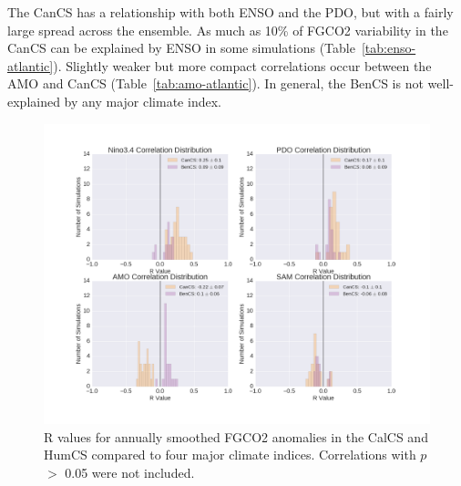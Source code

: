 \documentclass[12pt]{article}
\begin{document}
The CanCS has a relationship with both ENSO and the PDO, but with a fairly large spread across the ensemble. As much as 10\% of FGCO2 variability in the CanCS can be explained by ENSO in some simulations (Table~\ref{tab:enso-atlantic}). Slightly weaker but more compact correlations occur between the AMO and CanCS (Table~\ref{tab:amo-atlantic}). In general, the BenCS is not well-explained by any major climate index.

\begin{figure}[!h]
	\centering
	\includegraphics[width=\linewidth]{../../figs/atlantic/atlantic-EBU-correlation-distributions-bothSmoothed.png}
	\caption{R values for annually smoothed FGCO2 anomalies in the CalCS and HumCS compared to four major climate indices. Correlations with $p$ $>$ 0.05 were not included.}
	\label{fig:atlantic-histograms}
\end{figure}
\end{document}

